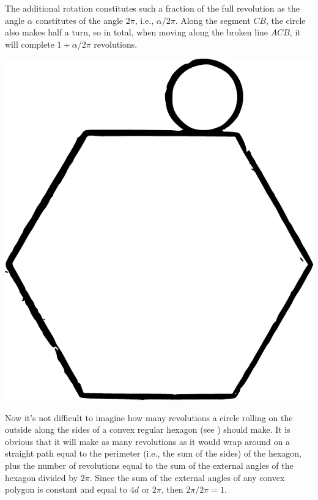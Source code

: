 The additional rotation constitutes such a fraction of the full revolution as the angle $ \alpha $ constitutes of the angle $ 2\pi $, i.e., $ \alpha/2\pi $. Along the segment $ CB $, the circle also makes half a turn, so in total, when moving along the broken line $ ACB $, it will complete $ 1 + \alpha/2\pi $ revolutions.

\begin{marginfigure}%
\centering
\includegraphics[width=\textwidth]{figures/ch-09/fig-129.pdf}
\end{marginfigure}

Now it's not difficult to imagine how many revolutions a circle rolling on the outside along the sides of a convex regular hexagon (see ) should make. It is obvious that it will make as many revolutions as it would wrap around on a straight path equal to the perimeter (i.e., the sum of the sides) of the hexagon, plus the number of revolutions equal to the sum of the external angles of the hexagon divided by $ 2\pi $. Since the sum of the external angles of any convex polygon is constant and equal to $ 4d $ or $ 2\pi $, then $ 2\pi / 2\pi = 1 $.

